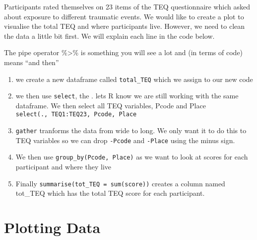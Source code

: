 \documentclass[]{book}
\newenvironment{Shaded}{\begin{snugshade}}{\end{snugshade}}
\newcommand{\DataTypeTok}[1]{\textcolor[rgb]{0.13,0.29,0.53}{#1}}
\newcommand{\KeywordTok}[1]{\textcolor[rgb]{0.13,0.29,0.53}{\textbf{#1}}}
\newcommand{\NormalTok}[1]{#1}
\newcommand{\OperatorTok}[1]{\textcolor[rgb]{0.81,0.36,0.00}{\textbf{#1}}}
\newcommand{\StringTok}[1]{\textcolor[rgb]{0.31,0.60,0.02}{#1}}
\providecommand{\tightlist}{%
  \setlength{\itemsep}{0pt}\setlength{\parskip}{0pt}}
\begin{document}
Participants rated themselves on 23 items of the TEQ questionnaire which asked about exposure to different traumatic events. We would like to create a plot to visualise the total TEQ and where participants live. However, we need to clean the data a little bit first. We will explain each line in the code below.

The pipe operator \%\textgreater{}\% is something you will see a lot and (in terms of code) means ``and then''

\begin{enumerate}
\def\labelenumi{\arabic{enumi}.}
\tightlist
\item
  we create a new dataframe called \texttt{total\_TEQ} which we assign to our new code
\item
  we then use \texttt{select}, the . lets R know we are still working with the same dataframe. We then select all TEQ variables, Pcode and Place \texttt{select(.,\ TEQ1:TEQ23,\ Pcode,\ Place}
\item
  \texttt{gather} tranforms the data from wide to long. We only want it to do this to TEQ variables so we can drop \texttt{-Pcode} and \texttt{-Place} using the minus sign.
\item
  We then use \texttt{group\_by(Pcode,\ Place)} as we want to look at scores for each participant and where they live
\item
  Finally \texttt{summarise(tot\_TEQ\ =\ sum(score))} creates a column named tot\_TEQ which has the total TEQ score for each participant.
\end{enumerate}

\begin{Shaded}
\end{Shaded}

\hypertarget{plotting-data}{%
\section{Plotting Data}\label{plotting-data}}
\end{document}
